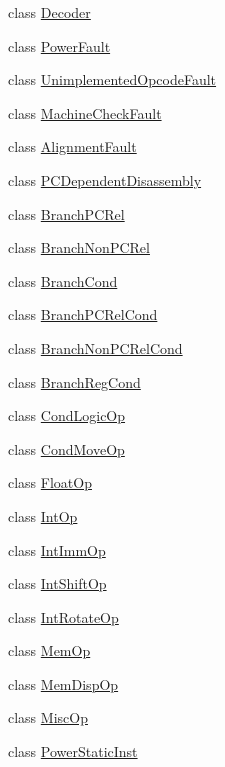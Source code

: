 \begin{DoxyCompactItemize}
\item 
class \hyperlink{classPowerISA_1_1Decoder}{Decoder}
\item 
class \hyperlink{classPowerISA_1_1PowerFault}{PowerFault}
\item 
class \hyperlink{classPowerISA_1_1UnimplementedOpcodeFault}{UnimplementedOpcodeFault}
\item 
class \hyperlink{classPowerISA_1_1MachineCheckFault}{MachineCheckFault}
\item 
class \hyperlink{classPowerISA_1_1AlignmentFault}{AlignmentFault}
\item 
class \hyperlink{classPowerISA_1_1PCDependentDisassembly}{PCDependentDisassembly}
\item 
class \hyperlink{classPowerISA_1_1BranchPCRel}{BranchPCRel}
\item 
class \hyperlink{classPowerISA_1_1BranchNonPCRel}{BranchNonPCRel}
\item 
class \hyperlink{classPowerISA_1_1BranchCond}{BranchCond}
\item 
class \hyperlink{classPowerISA_1_1BranchPCRelCond}{BranchPCRelCond}
\item 
class \hyperlink{classPowerISA_1_1BranchNonPCRelCond}{BranchNonPCRelCond}
\item 
class \hyperlink{classPowerISA_1_1BranchRegCond}{BranchRegCond}
\item 
class \hyperlink{classPowerISA_1_1CondLogicOp}{CondLogicOp}
\item 
class \hyperlink{classPowerISA_1_1CondMoveOp}{CondMoveOp}
\item 
class \hyperlink{classPowerISA_1_1FloatOp}{FloatOp}
\item 
class \hyperlink{classPowerISA_1_1IntOp}{IntOp}
\item 
class \hyperlink{classPowerISA_1_1IntImmOp}{IntImmOp}
\item 
class \hyperlink{classPowerISA_1_1IntShiftOp}{IntShiftOp}
\item 
class \hyperlink{classPowerISA_1_1IntRotateOp}{IntRotateOp}
\item 
class \hyperlink{classPowerISA_1_1MemOp}{MemOp}
\item 
class \hyperlink{classPowerISA_1_1MemDispOp}{MemDispOp}
\item 
class \hyperlink{classPowerISA_1_1MiscOp}{MiscOp}
\item 
class \hyperlink{classPowerISA_1_1PowerStaticInst}{PowerStaticInst}
\item 

\end{DoxyCompactItemize}
